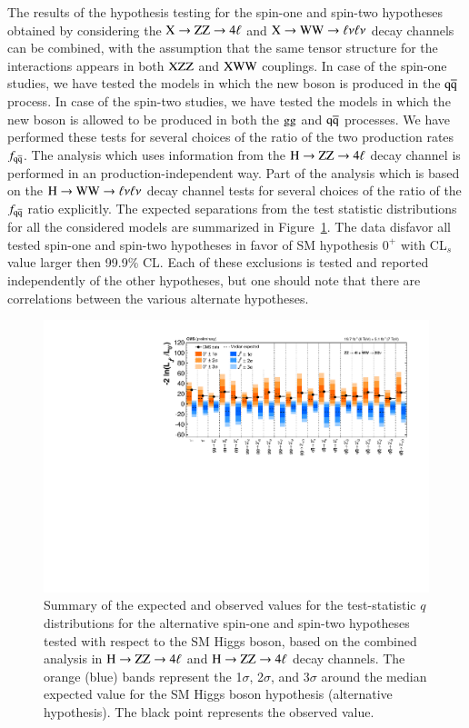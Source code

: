 The results of the hypothesis testing for the spin-one and spin-two
hypotheses obtained by considering the $\mathrm{X}\to\mathrm{Z}\mathrm{Z}\to4\ell$ and
$\mathrm{X}\to\mathrm{W}\mathrm{W}\to\ell\nu\ell\nu$ decay channels can be combined, with the
assumption that the same tensor structure for the interactions appears
in both $\mathrm{X}\mathrm{Z}\mathrm{Z}$ and $\mathrm{X}\mathrm{W}\mathrm{W}$ couplings.  In case of the spin-one
studies, we have tested the models in which the new boson is produced
in the $\mathrm{\mathrm{q}\mathrm{\overline{q}}}$ process. In case of the spin-two studies, we have
tested the models in which the new boson is allowed to be produced in
both the $\mathrm{g}\mathrm{g}$ and $\mathrm{\mathrm{q}\mathrm{\overline{q}}}$ processes.  We have performed these
tests for several choices of the ratio of the two production rates
$f_{\mathrm{\mathrm{q}\mathrm{\overline{q}}}}$.  The analysis which uses information from the $\mathrm{H}\to\mathrm{Z}\mathrm{Z}\to4\ell$
decay channel is performed in an production-independent way.  Part of
the analysis which is based on the $\mathrm{H}\to\mathrm{W}\mathrm{W}\to\ell\nu\ell\nu$ decay channel tests for
several choices of the ratio of the $f_{\mathrm{\mathrm{q}\mathrm{\overline{q}}}}$ ratio explicitly.
The expected separations from the test statistic distributions for all
the considered models are summarized in 
Figure~\ref{fig:jp_summary_comb}. The data disfavor all tested
spin-one and spin-two hypotheses in favor of SM hypothesis $0^+$ with
CL$_s$ value larger then 99.9\% CL. Each of these exclusions is tested
and reported independently of the other hypotheses, but one should
note that there are correlations between the various alternate
hypotheses.

\begin{figure}[!htbp]
  \begin{center}
    \includegraphics[width=0.95\linewidth]{figures/JP_SummaryPlot.pdf}
    \caption{
     Summary of the expected and observed values for the
      test-statistic $q$ distributions for the alternative spin-one and spin-two
      hypotheses tested with respect to the SM Higgs boson, based on the 
     combined analysis in $\mathrm{H}\to\mathrm{Z}\mathrm{Z}\to4\ell$ and 
     $\mathrm{H}\to\mathrm{Z}\mathrm{Z}\to4\ell$ decay channels.  The
      orange (blue) bands represent the 1$\sigma$, 2$\sigma$, and
      3$\sigma$ around the median expected value for the SM Higgs
      boson hypothesis (alternative hypothesis). The black point
      represents the observed value.
      \label{fig:jp_summary_comb}} 
  \end{center}
\end{figure}


